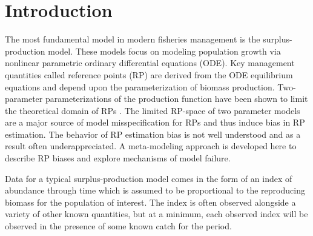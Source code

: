 \documentclass[12pt]{article}
\begin{document}
%
\clearpage
\section{Introduction}

%
The most fundamental model in modern fisheries management is the surplus-production
model. These models focus on modeling population growth via nonlinear parametric 
ordinary differential equations (ODE). Key management quantities called reference 
points (RP) are derived from the ODE equilibrium equations and depend upon the 
parameterization of biomass production. Two-parameter parameterizations of the 
production function have been shown to limit the theoretical domain of RPs 
. The limited RP-space of two parameter models
are a major source of model misspecification for RPs and thus induce bias in 
RP estimation. The behavior of RP estimation bias is not well understood and
as a result often underappreciated. A meta-modeling approach is developed here 
to describe RP biases and explore mechanisms of model failure. 

%

Data for a typical surplus-production model comes in the form of an index 
of abundance through time which is assumed to be proportional to the reproducing 
biomass for the population of interest. The index is often observed alongside 
a variety of other known quantities, but at a minimum, each observed index 
will be observed in the presence of some known catch for the period. 
\end{document}
